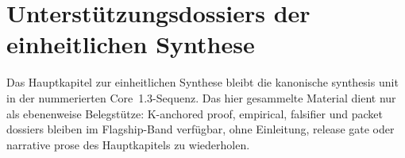 \section{Unterstützungsdossiers der einheitlichen Synthese}
\label{sec:oc-core-1-3-synthesis-support-dossiers}

Das Hauptkapitel zur einheitlichen Synthese bleibt die kanonische synthesis
unit in der nummerierten Core~1.3-Sequenz. Das hier gesammelte Material dient
nur als ebenenweise Belegstütze: K-anchored proof, empirical, falsifier und
packet dossiers bleiben im Flagship-Band verfügbar, ohne Einleitung,
release gate oder narrative prose des Hauptkapitels zu wiederholen.


